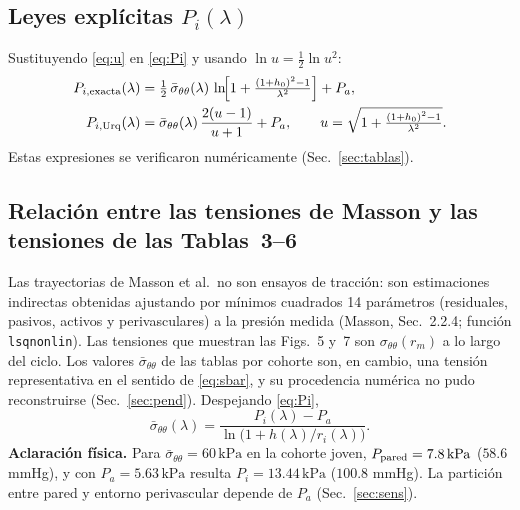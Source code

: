 \documentclass[11pt]{article}
\newcommand{\kPa}{\,\mathrm{kPa}}
\newcommand{\sbar}{\bar\sigma_{\theta\theta}}
\begin{document}
\subsection{Leyes explícitas $P_i(\lambda)$}
Sustituyendo \eqref{eq:u} en \eqref{eq:Pi} y usando $\ln u=\tfrac12\ln u^2$:
\begin{align}
P_{i,\rm exacta}(\lambda)&=\tfrac12\,\sbar(\lambda)\,\ln\!\Bigl[1+\tfrac{(1+h_0)^2-1}{\lambda^{2}}\Bigr]+P_a,\label{eq:Pexacta}\\
P_{i,\rm Urq}(\lambda)&=\sbar(\lambda)\,\frac{2(u-1)}{u+1}+P_a,\qquad u=\sqrt{1+\tfrac{(1+h_0)^2-1}{\lambda^{2}}}.\label{eq:Purq}
\end{align}
Estas expresiones se verificaron numéricamente (Sec.~\ref{sec:tablas}).

\subsection{Relación entre las tensiones de Masson y las tensiones de las Tablas~3--6}\label{sec:rel}
Las trayectorias de Masson et al.\ no son ensayos de tracción: son estimaciones indirectas obtenidas ajustando por mínimos cuadrados 14 parámetros (residuales, pasivos, activos y perivasculares) a la presión medida (Masson, Sec.~2.2.4; función \texttt{lsqnonlin}). Las tensiones que muestran las Figs.~5 y~7 son $\sigma_{\theta\theta}(r_m)$ a lo largo del ciclo. Los valores $\sbar$ de las tablas por cohorte son, en cambio, una tensión representativa en el sentido de \eqref{eq:sbar}, y su procedencia numérica no pudo reconstruirse (Sec.~\ref{sec:pend}). Despejando \eqref{eq:Pi},
\begin{equation}
\sbar(\lambda)=\frac{P_i(\lambda)-P_a}{\ln\bigl(1+h(\lambda)/r_i(\lambda)\bigr)} .
\label{eq:inv}
\end{equation}
\textbf{Aclaración física.} Para $\sbar=60\kPa$ en la cohorte joven, $P_{\rm pared}=7.8\kPa$ ($58.6$ mmHg), y con $P_a=5.63\kPa$ resulta $P_i=13.44\kPa$ ($100.8$ mmHg). La partición entre pared y entorno perivascular depende de $P_a$ (Sec.~\ref{sec:sens}).

\end{document}
